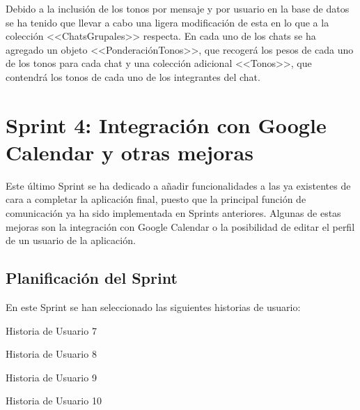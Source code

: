 Debido a la inclusión de los tonos por mensaje y por usuario en la base de datos se ha tenido que llevar a cabo una ligera modificación de esta en lo que a la colección <<ChatsGrupales>> respecta. En cada uno de los chats se ha agregado un objeto <<PonderaciónTonos>>, que recogerá los pesos de cada uno de los tonos para cada chat y una colección adicional <<Tonos>>, que contendrá los tonos de cada uno de los integrantes del chat.

\clearpage


\section{Sprint 4: Integración con Google Calendar y otras mejoras}
Este último Sprint se ha dedicado a añadir funcionalidades a las ya existentes de cara a completar la aplicación final, puesto que la principal función de comunicación ya ha sido implementada en Sprints anteriores. Algunas de estas mejoras son la integración con Google Calendar o la posibilidad de editar el perfil de un usuario de la aplicación.

\subsection{Planificación del Sprint}
En este Sprint se han seleccionado las siguientes historias de usuario:

\begin{table}[hp]
	\centering
	{\small
		
	}
	\caption[Historia de Usuario 7]
	{Historia de Usuario 7}
	\label{tab:historia7}
\end{table}

\begin{table}[hp]
	\centering
	{\small
		
	}
	\caption[Historia de Usuario 8]
	{Historia de Usuario 8}
	\label{tab:historia8}
\end{table}

\clearpage

\begin{table}[hp]
	\centering
	{\small
		
	}
	\caption[Historia de Usuario 9]
	{Historia de Usuario 9}
	\label{tab:historia9}
\end{table}

\begin{table}[!htbp]
	\centering
	{\small
		
	}
	\caption[Historia de Usuario 10]
	{Historia de Usuario 10}
	\label{tab:historia10}
\end{table}

